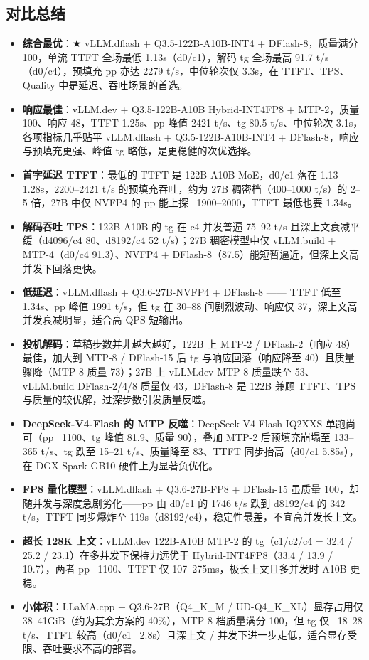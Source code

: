 \documentclass{article}
\begin{document}
\subsection{对比总结}
\begin{itemize}
    \item \textbf{综合最优}：$\bigstar$ vLLM.dflash + Q3.5-122B-A10B-INT4 + DFlash-8，质量满分 100，单流 TTFT 全场最低 1.13s（d0/c1），解码 tg 全场最高 91.7 t/s（d0/c4），预填充 pp 亦达 2279 t/s，中位轮次仅 3.3s，在 TTFT、TPS、Quality 中是延迟、吞吐场景的首选。
    \item \textbf{响应最佳}：vLLM.dev + Q3.5-122B-A10B Hybrid-INT4FP8 + MTP-2，质量 100、响应 48，TTFT 1.25s、pp 峰值 2421 t/s、tg 80.5 t/s、中位轮次 3.1s，各项指标几乎贴平 vLLM.dflash + Q3.5-122B-A10B-INT4 + DFlash-8，响应与预填充更强、峰值 tg 略低，是更稳健的次优选择。
    \item \textbf{首字延迟 TTFT}：最低的 TTFT 是 122B-A10B MoE，d0/c1 落在 1.13--1.28s，2200--2421 t/s 的预填充吞吐，约为 27B 稠密档（400--1000 t/s）的 2--5 倍，27B 中仅 NVFP4 的 pp 能上探 ~1900--2000，TTFT 最低也要 1.34s。
    \item \textbf{解码吞吐 TPS}：122B-A10B 的 tg 在 c4 并发普遍 75--92 t/s 且深上文衰减平缓（d4096/c4 80、d8192/c4 52 t/s）；27B 稠密模型中仅 vLLM.build + MTP-4（d0/c4 91.3）、NVFP4 + DFlash-8（87.5）能短暂逼近，但深上文高并发下回落更快。
    \item \textbf{低延迟}：vLLM.dflash + Q3.6-27B-NVFP4 + DFlash-8 —— TTFT 低至 1.34s、pp 峰值 1991 t/s，但 tg 在 30--88 间剧烈波动、响应仅 37，深上文高并发衰减明显，适合高 QPS 短输出。
    \item \textbf{投机解码}：草稿步数并非越大越好，122B 上 MTP-2 / DFlash-2（响应 48）最佳，加大到 MTP-8 / DFlash-15 后 tg 与响应回落（响应降至 40）且质量骤降（MTP-8 质量 73）；27B 上 vLLM.dev MTP-8 质量跌至 53、vLLM.build DFlash-2/4/8 质量仅 43，DFlash-8 是 122B 兼顾 TTFT、TPS 与质量的较优解，过深步数引发质量反噬。
    \item \textbf{DeepSeek-V4-Flash 的 MTP 反噬}：DeepSeek-V4-Flash-IQ2XXS 单跑尚可（pp ~1100、tg 峰值 81.9、质量 90），叠加 MTP-2 后预填充崩塌至 133--365 t/s、tg 跌至 15--21 t/s、质量降至 83、TTFT 同步抬高（d0/c1 5.85s），在 DGX Spark GB10 硬件上为显著负优化。
    \item \textbf{FP8 量化模型}：vLLM.dflash + Q3.6-27B-FP8 + DFlash-15 虽质量 100，却随并发与深度急剧劣化——pp 由 d0/c1 的 1746 t/s 跌到 d8192/c4 的 342 t/s，TTFT 同步爆炸至 119s（d8192/c4），稳定性最差，不宜高并发长上文。
    \item \textbf{超长 128K 上文}：vLLM.dev 122B-A10B MTP-2 的 tg（c1/c2/c4 = 32.4 / 25.2 / 23.1）在多并发下保持力远优于 Hybrid-INT4FP8（33.4 / 13.9 / 10.7），两者 pp ~1100、TTFT 仅 107--275ms，极长上文且多并发时 A10B 更稳。
    \item \textbf{小体积}：LLaMA.cpp + Q3.6-27B（Q4\_K\_M / UD-Q4\_K\_XL）显存占用仅 38--41GiB（约为其余方案的 40\%），MTP-8 档质量满分 100，但 tg 仅 ~18--28 t/s、TTFT 较高（d0/c1 ~2.8s）且深上文 / 并发下进一步走低，适合显存受限、吞吐要求不高的部署。
\end{itemize}
\end{document}
